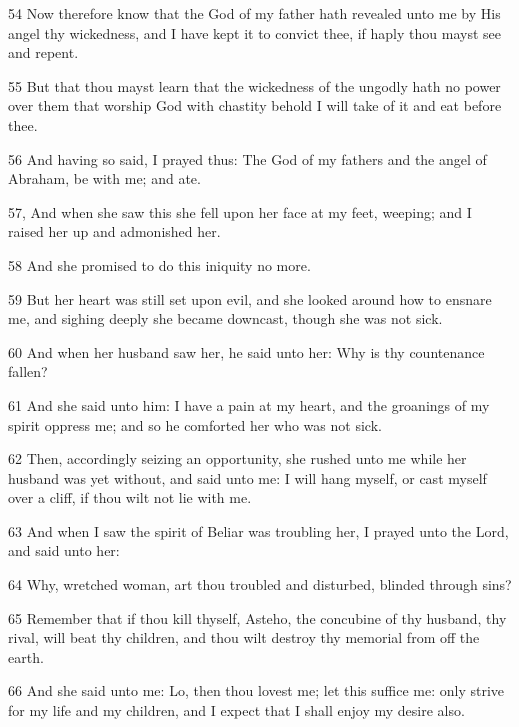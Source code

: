 \par 54 Now therefore know that the God of my father hath revealed unto me by His angel thy wickedness, and I have kept it to convict thee, if haply thou mayst see and repent.

\par 55 But that thou mayst learn that the wickedness of the ungodly hath no power over them that worship God with chastity behold I will take of it and eat before thee.

\par 56 And having so said, I prayed thus: The God of my fathers and the angel of Abraham, be with me; and ate.

\par 57, And when she saw this she fell upon her face at my feet, weeping; and I raised her up and admonished her.

\par 58 And she promised to do this iniquity no more.

\par 59 But her heart was still set upon evil, and she looked around how to ensnare me, and sighing deeply she became downcast, though she was not sick.

\par 60 And when her husband saw her, he said unto her: Why is thy countenance fallen?

\par 61 And she said unto him: I have a pain at my heart, and the groanings of my spirit oppress me; and so he comforted her who was not sick.

\par 62 Then, accordingly seizing an opportunity, she rushed unto me while her husband was yet without, and said unto me: I will hang myself, or cast myself over a cliff, if thou wilt not lie with me.

\par 63 And when I saw the spirit of Beliar was troubling her, I prayed unto the Lord, and said unto her:

\par 64 Why, wretched woman, art thou troubled and disturbed, blinded through sins?

\par 65 Remember that if thou kill thyself, Asteho, the concubine of thy husband, thy rival, will beat thy children, and thou wilt destroy thy memorial from off the earth.

\par 66 And she said unto me: Lo, then thou lovest me; let this suffice me: only strive for my life and my children, and I expect that I shall enjoy my desire also.

